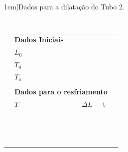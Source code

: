 \begin{table}[!ht]
\forceversofloat
\caption[][1cm]{Dados para a dilatação do Tubo 2.}
\label{Tab:DadosTubo2}
\centering
	\begin{tabular}{lllll}
		\toprule
		&\textbf{Dados Iniciais}\\
		\cmidrule{2-3}
		& \cellcolor[gray]{0.89}$L_0$ &\cellcolor[gray]{0.92}\\
		& \cellcolor[gray]{0.95}$T_0$ & \cellcolor[gray]{0.97}\\
		& \cellcolor[gray]{0.89}$T_a$ & \cellcolor[gray]{0.92}\\
		\cmidrule{2-3}
\\
		&\multicolumn{3}{l}{\textbf{Dados para o resfriamento}} \\
		\cmidrule{2-4}
		& $T$ & $\Delta L$ & t &\\
		\cmidrule{2-4}
		& \cellcolor[gray]{0.89} \phantom{xxxxxxxxxxxxxxxxxxxx}& \cellcolor[gray]{0.92} \phantom{xxxxxxxxxxxxxxxxxxxx} &  \cellcolor[gray]{0.89} \phantom{xxxxxxxxxxxxxxxxxxxx} \\
		& \cellcolor[gray]{0.95} & \cellcolor[gray]{0.97} & \cellcolor[gray]{0.95} \\
		& \cellcolor[gray]{0.89} & \cellcolor[gray]{0.92} & \cellcolor[gray]{0.89} \\
		& \cellcolor[gray]{0.95} & \cellcolor[gray]{0.97} & \cellcolor[gray]{0.95} \\
		& \cellcolor[gray]{0.89} & \cellcolor[gray]{0.92} & \cellcolor[gray]{0.89} \\
		& \cellcolor[gray]{0.95} & \cellcolor[gray]{0.97} & \cellcolor[gray]{0.95} \\
		& \cellcolor[gray]{0.89} & \cellcolor[gray]{0.92} & \cellcolor[gray]{0.89} \\
		& \cellcolor[gray]{0.95} & \cellcolor[gray]{0.97} & \cellcolor[gray]{0.95} \\
		& \cellcolor[gray]{0.89} & \cellcolor[gray]{0.92} & \cellcolor[gray]{0.89} \\
		& \cellcolor[gray]{0.95} & \cellcolor[gray]{0.97} & \cellcolor[gray]{0.95} \\
		& \cellcolor[gray]{0.89} & \cellcolor[gray]{0.92} & \cellcolor[gray]{0.89} \\
		& \cellcolor[gray]{0.95} & \cellcolor[gray]{0.97} & \cellcolor[gray]{0.95} \\
		& \cellcolor[gray]{0.89} & \cellcolor[gray]{0.92} & \cellcolor[gray]{0.89} \\
		& \cellcolor[gray]{0.95} & \cellcolor[gray]{0.97} & \cellcolor[gray]{0.95} \\

\end{tabular}
\end{table}
